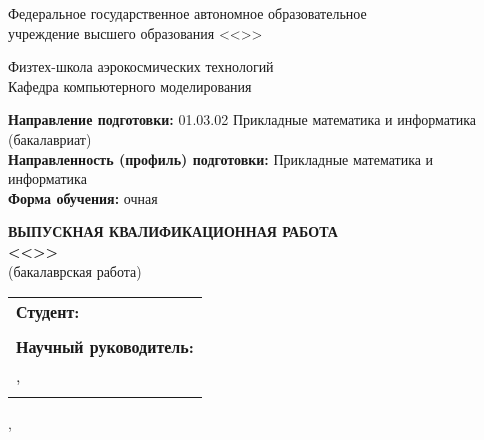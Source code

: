 
\thispagestyle{empty}%
\begin{center}%
  Федеральное государственное автономное образовательное \\
  учреждение высшего образования <<\thesisOrganization{}>>

  \smallskip
  {\small
  Физтех-школа аэрокосмических технологий \\
  Кафедра компьютерного моделирования
  }
\end{center}%

\bigskip
{\small\noindent
\textbf{Направление подготовки:} 01.03.02 Прикладные математика и информатика (бакалавриат) \\
\textbf{Направленность (профиль) подготовки:} Прикладные математика и информатика \\
\textbf{Форма обучения:} очная
}

\vspace{0pt plus 8fill}%

\begin{center}%
  \textbf{%
    \MakeUppercase{Выпускная квалификационная работа} \\
    <<\thesisTitle>> \\
  }
  (бакалаврская работа)

  \vspace{0pt plus 3fill}%

  \begin{flushright}
    \begin{tabular}{l}
      \textbf{Студент:} \\
      \thesisAuthor{} \\[7ex]

      \textbf{Научный руководитель:} \\
      \supervisorRegaliaShort{}, \\
      \supervisorFio{}
    \end{tabular}
  \end{flushright}

  \vspace{0pt plus 4fill}%
  {\thesisCity{}, \thesisYear{}}
\end{center}
